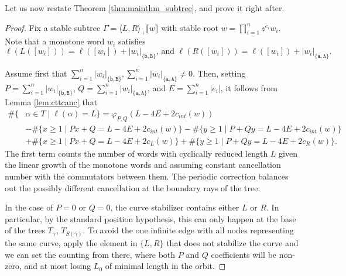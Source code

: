 \documentclass{article}
\begin{document}
	Let us now restate Theorem \ref{thm:mainthm_subtree}, and prove it right after. 
	
	\theoremsubtree*
	
	\begin{proof}
		Fix a stable subtree $\Gamma=\langle L, R\rangle_+ \llbracket w\rrbracket$ with stable root $w=\prod_{i=1}^n z^{e_i}w_i$. Note that a monotone word $w_i$ satisfies
		\[
		\ell(L([w_i]))=\ell([w_i])+|w_i|_{\{\mathtt{b},\mathtt{B}\}}\text{, and }\ell(R([w_i]))=\ell([w_i])+|w_i|_{\{\mathtt{a},\mathtt{A}\}}.\] 

        Assume first that $\sum_{i=1}^n|w_i|_{\{\mathtt{b},\mathtt{B}\}},\sum_{i=1}^n|w_i|_{\{\mathtt{a},\mathtt{A}\}}\neq0$. 
		Then, setting $P=\sum_{i=1}^n|w_i|_{\{\mathtt{b},\mathtt{B}\}}$, $Q=\sum_{i=1}^n|w_i|_{\{\mathtt{a},\mathtt{A}\}}$, and $E=\sum_{i=1}^n |e_i|$, it follows from Lemma \ref{lem:cttcanc} that
		\begin{align*}
			\#\{&\alpha\in T \mid \ell(\alpha)=L\}=\varphi_{P,Q}(L-4E+2c_{int}(w))\\&-\#\{x\geq1\mid Px+Q=L-4E+2c_{int}(w)\}-\#\{y\geq1\mid P+Qy=L-4E+2c_{int}(w)\}\\&+\#\{x\geq1\mid Px+Q=L-4E+2c_{L}(w)\}+\#\{y\geq1\mid P+Qy=L-4E+2c_{R}(w)\}.
		\end{align*}	
		The first term counts the number of words with cyclically reduced length $L$ given the linear growth of the monotone words and assuming constant cancellation number with the commutators between them. The periodic correction balances out the possibly different cancellation at the boundary rays of the tree.

        In the case of $P=0$ or $Q=0$, the curve stabilizer contains either $L$ or $R$. In particular, by the standard position hypothesis, this can only happen at the base of the trees $T_\gamma$, $T_{S(\gamma)}$. To avoid the one infinite edge with all nodes representing the same curve, apply the element in $\{L,R\}$ that does not stabilize the curve and we can set the counting from there, where both $P$ and $Q$ coefficients will be non-zero, and at most losing $L_0$ of minimal length in the orbit.
		
	\end{proof}
	
	
	
\end{document}
